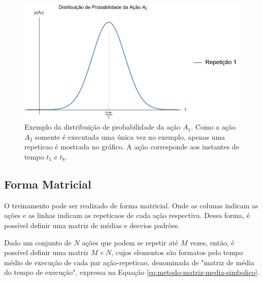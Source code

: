 \begin{figure}[htb]
	\caption{\label{fig:metodo-exemplo-bo-media-a2} Exemplo da distribuição de probabilidade da ação $A_1$. Como a ação $A_2$ somente é executada uma única vez no exemplo, apenas uma \gls{repeticao} é mostrada no gráfico. A ação corresponde aos instantes de tempo $t_5$ e $t_8$.}
	\begin{center}
	    \includegraphics[width=\linewidth]{../Mathematica/Images/Exemplo_BO_Media_A2.pdf}
	\end{center}
\end{figure}

			\subsection{Forma Matricial}
O treinamento pode ser realizado de forma matricial. Onde as colunas indicam as ações e as linhas indicam as \glspl{repeticao} de cada ação respectiva. Dessa forma, é possível definir uma matriz de médias e desvios padrões.

Dado um conjunto de $N$ ações que podem se repetir até $M$ vezes, então, é possível definir uma matriz $M \times N$, cujos elementos são formatos pelo tempo médio de execução de cada par ação-\gls{repeticao}, denominada de "matriz de média do tempo de execução", expressa na Equação \ref{eq:metodo-matriz-media-simbolico}.

\newcommand{\RogielBOMatrix}[1]{
	\ensuremath{
		\left(\begin{array}{cccc}
 			{#1}_{A_1,1} & {#1}_{A_2,1} & \cdots & {#1}_{A_N,1} \\
 			{#1}_{A_1,2} & {#1}_{A_2,2} & \cdots & {#1}_{A_N,2} \\
 			\vdots 		 & \vdots 	    & \ddots & \vdots 		\\
 			{#1}_{A_1,M} & {#1}_{A_2,M} & \cdots & {#1}_{A_N,M}
		\end{array}\right)
	}
}

